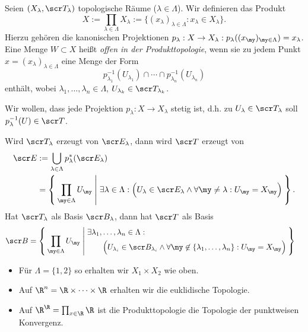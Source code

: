 \begin{df}
	Seien $(X_\lambda, \scr T_\lambda)$ topologische Räume ($\lambda \in \Lambda$).
	Wir definieren das Produkt
	\[
		X
		:= \prod_{\lambda\in\Lambda} X_\lambda
		:= \big\{ (x_\lambda)_{\lambda\in\Lambda} : x_\lambda \in X_\lambda \big\}.
	\]
	Hierzu gehören die kanonischen Projektionen $p_\lambda: X \to X_\lambda: p_\lambda((x_\my)_{\my\in\Lambda}) = x_\lambda$.
	Eine Menge $W \subset X$ heißt \emph{offen in der Produkttopologie}, wenn sie zu jedem Punkt $x=(x_\lambda)_{\lambda\in\Lambda}$ eine Menge der Form
	\[
		p_{\lambda_1}^{-1}(U_{\lambda_1})
		\cap \dotsb \cap
		p_{\lambda_n}^{-1}(U_{\lambda_n})
	\]
	enthält, wobei $\lambda_1, \dotsc, \lambda_n \in \Lambda$, $U_{\lambda_k} \in \scr T_{\lambda_k}$.
	\begin{note}
		Wir wollen, dass jede Projektion $p_\lambda : X \to X_\lambda$ stetig ist, d.h. zu $U_\lambda \in \scr T_\lambda$ soll $p_\lambda^{-1}(U) \in \scr T$.
	\end{note}
	\begin{note}
		Wird $\scr T_\lambda$ erzeugt von $\scr E_\lambda$, dann wird $\scr T$ erzeugt von
		\begin{align*}
			\scr E
			&:= \bigcup_{\lambda\in\Lambda} p_\lambda^*(\scr E_\lambda) \\
			&= \Set{ \prod_{\my\in\Lambda} U_\my |
				\exists \lambda\in\Lambda :
				\Big( U_\lambda \in \scr E_\lambda
				\land \forall \my\neq\lambda : U_\my = X_\my \Big)
			}.
		\end{align*}
		Hat $\scr T_\lambda$ als Basis $\scr B_\lambda$, dann hat $\scr T$ als Basis
		\begin{align*}
			\scr B &=
			\Set{ \prod_{\my\in\Lambda} U_\my |
				\begin{aligned}
				&\exists \lambda_1, \dotsc, \lambda_n \in \Lambda : \\
				& \qquad \Big( U_{\lambda_i} \in \scr B_{\lambda_i}
				\land \forall \my \not\in \{\lambda_1, \dotsc, \lambda_n\} : U_\my = X_\my \Big)
				\end{aligned}
			}
		\end{align*}
	\end{note}
\end{df}


\begin{ex}
	\begin{itemize}
		\item
			Für $\Lambda = \{1,2\}$ so erhalten wir $X_1 \times X_2$ wie oben.
		\item
			Auf $\R^n = \R \times \dotsb \times \R$ erhalten wir die euklidische Topologie.
		\item
			Auf $\R^\R = \prod_{x\in\R} \R$ ist die Produkttopologie die Topologie der punktweisen Konvergenz.
	\end{itemize}
\end{ex}

